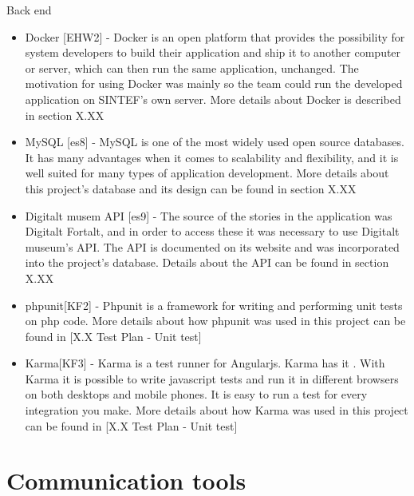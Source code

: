 \noindent Back end
\begin{itemize}
	\item Docker [EHW2] - Docker is an open platform that provides the possibility for system developers to build their application and ship it to another computer or server, which can then run the same application, unchanged. The motivation for using Docker was mainly so the team could run the developed application on SINTEF’s own server. More details about Docker is described in section X.XX
	\item MySQL [es8] - MySQL is one of the most widely used open source databases. It has many advantages when it comes to scalability and flexibility, and it is well suited for many types of application development. More details about this project’s database and its design can be found in section X.XX
	\item Digitalt musem API [es9] - The source of the stories in the application was Digitalt Fortalt, and in order to access these it was necessary to use Digitalt museum’s API. The API is documented on its website and was incorporated into the project’s database. Details about the API can be found in section X.XX
	\item phpunit[KF2] - Phpunit is a framework for writing and performing unit tests on php code. More details about how phpunit was used in this project can be found in [X.X Test Plan - Unit test]
	\item Karma[KF3] - Karma is a test runner for Angularjs. Karma has it . With Karma it is possible to write javascript tests and run it in different browsers on both desktops and mobile phones. It is easy to run a test for every integration you make. More details about how Karma was used in this project can be found in [X.X Test Plan - Unit test]
\end{itemize}

\section{Communication tools}

